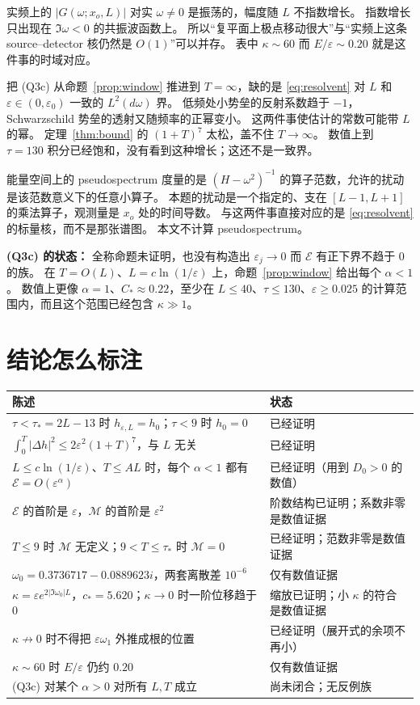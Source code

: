 \documentclass[11pt]{ctexart}
\theoremstyle{definition}
\theoremstyle{remark}
\newcommand{\eps}{\varepsilon}
\newcommand{\cE}{\mathcal E}
\newcommand{\cM}{\mathcal M}
\begin{document}
实频上的 $|G(\omega;x_o,L)|$ 对实 $\omega\neq0$ 是振荡的，幅度随 $L$ 不指数增长。
指数增长只出现在 $\Im\omega<0$ 的共振波函数上。
所以“复平面上极点移动很大”与“实频上这条 source--detector 核仍然是 $O(1)$”可以并存。
表中 $\kappa\sim60$ 而 $E/\eps\sim0.20$ 就是这件事的时域对应。

把 (Q3c) 从命题~\ref{prop:window} 推进到 $T=\infty$，缺的是 \eqref{eq:resolvent} 对 $L$ 和 $\eps\in(0,\eps_0)$ 一致的 $L^2(d\omega)$ 界。
低频处小势垒的反射系数趋于 $-1$，Schwarzschild 势垒的透射又随频率的正幂变小。
这两件事使估计的常数可能带 $L$ 的幂。
定理~\ref{thm:bound} 的 $(1+T)^7$ 太松，盖不住 $T\to\infty$。
数值上到 $\tau=130$ 积分已经饱和，没有看到这种增长；这还不是一致界。

能量空间上的 pseudospectrum 度量的是 $(H-\omega^2)^{-1}$ 的算子范数，允许的扰动是该范数意义下的任意小算子。
本题的扰动是一个指定的、支在 $[L-1,L+1]$ 的乘法算子，观测量是 $x_o$ 处的时间导数。
与这两件事直接对应的是 \eqref{eq:resolvent} 的标量核，而不是那张谱图。
本文不计算 pseudospectrum。

\textbf{(Q3c) 的状态：} 全称命题未证明，也没有构造出 $\eps_j\to0$ 而 $\cE$ 有正下界不趋于 $0$ 的族。
在 $T=O(L)$、$L=c\ln(1/\eps)$ 上，命题~\ref{prop:window} 给出每个 $\alpha<1$。
数值上更像 $\alpha=1$、$C_*\approx0.22$，至少在 $L\le40$、$\tau\le130$、$\eps\ge0.025$ 的计算范围内，而且这个范围已经包含 $\kappa\gg1$。

\section{结论怎么标注}

\begin{center}
\small
\begin{tabular}{p{}p{}}
\toprule
陈述{} & 状态{}\tabularnewline
\midrule
$\tau<\tau_*=2L-13$ 时 $h_{\eps,L}=h_0$；$\tau<9$ 时 $h_0=0$ & 已经证明{}\tabularnewline
$\int_0^T|\Delta h|^2\le 2\eps^2(1+T)^7$，与 $L$ 无关 & 已经证明{}\tabularnewline
$L\le c\ln(1/\eps)$、$T\le AL$ 时，每个 $\alpha<1$ 都有 $\cE=O(\eps^\alpha)$ & 已经证明（用到 $D_0>0$ 的数值）{}\tabularnewline
$\cE$ 的首阶是 $\eps$，$\cM$ 的首阶是 $\eps^2$ & 阶数结构已证明；系数非零是数值证据{}\tabularnewline
$T\le9$ 时 $\cM$ 无定义；$9<T\le\tau_*$ 时 $\cM=0$ & 已经证明；范数非零是数值证据{}\tabularnewline
$\omega_0=0.3736717-0.0889623i$，两套离散差 $10^{-6}$ & 仅有数值证据{}\tabularnewline
$\kappa=\eps e^{2|\Im\omega_0|L}$，$c_*=5.620$；$\kappa\to0$ 时一阶位移趋于 $0$ & 缩放已证明；小 $\kappa$ 的符合是数值证据{}\tabularnewline
$\kappa\not\to0$ 时不得把 $\eps\omega_1$ 外推成根的位置 & 已经证明（展开式的余项不再小）{}\tabularnewline
$\kappa\sim60$ 时 $E/\eps$ 仍约 $0.20$ & 仅有数值证据{}\tabularnewline
(Q3c) 对某个 $\alpha>0$ 对所有 $L,T$ 成立 & 尚未闭合；无反例族{}\tabularnewline
\bottomrule
\end{tabular}
\end{center}
\end{document}
